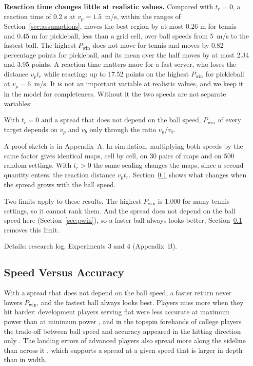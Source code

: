   \textbf{Reaction time changes little at realistic values.} Compared with $t_r
  = 0$, a reaction time of 0.2 s at $v_p = 1.5$~m/s, within the ranges of
  Section~\ref{sec:assumptions}, moves the best region by at most 0.26 m for
  tennis and 0.45 m for pickleball, less than a grid cell, over ball speeds from
  5~m/s to the fastest ball. The highest $P_{\mathrm{win}}$ does not move for
  tennis and moves by 0.82 percentage points for pickleball, and its mean over
  the half moves by at most 2.34 and 3.95 points. A reaction time matters more
  for a fast server, who loses the distance $v_p t_r$ while reacting: up to
  17.52 points on the highest $P_{\mathrm{win}}$ for pickleball at $v_p =
  6$~m/s. It is not an important variable at realistic values, and we keep it in
  the model for completeness. Without it the two speeds are not separate
  variables:

  \begin{prop}\label{prop:ratio}
    With $t_r = 0$ and a spread that does not depend on the ball speed,
    $P_{\mathrm{win}}$ of every target depends on $v_p$ and $v_b$ only through
    the ratio $v_p / v_b$.
  \end{prop}

  A proof sketch is in Appendix~A. In simulation, multiplying both speeds by the
  same factor gives identical maps, cell by cell, on 30 pairs of maps and on 500
  random settings. With $t_r > 0$ the same scaling changes the maps, since a
  second quantity enters, the reaction distance $v_p t_r$.
  Section~\ref{sec:speed} shows what changes when the spread grows with the
  ball speed.

  Two limits apply to these results. The highest $P_{\mathrm{win}}$ is 1.000 for
  many tennis settings, so it cannot rank them. And the spread does not depend
  on the ball speed here (Section~\ref{sec:pwin}), so a faster ball always looks
  better; Section~\ref{sec:speed} removes this limit.

  Details: research log, Experiments 3 and 4 (Appendix~B).

  \subsection{Speed Versus Accuracy}\label{sec:speed}

  With a spread that does not depend on the ball speed, a faster return never
  lowers $P_{\mathrm{win}}$, and the fastest ball always looks best. Players
  miss more when they hit harder: development players serving flat were less
  accurate at maximum power than at minimum power \cite{menayo2008serve}, and in
  the topspin forehands of college players the trade-off between ball speed and
  accuracy appeared in the hitting direction only \cite{sudo2024speedaccuracy}.
  The landing errors of advanced players also spread more along the sideline
  than across it \cite{delgadogarcia2019errors}, which supports a spread at a
  given speed that is larger in depth than in width.

